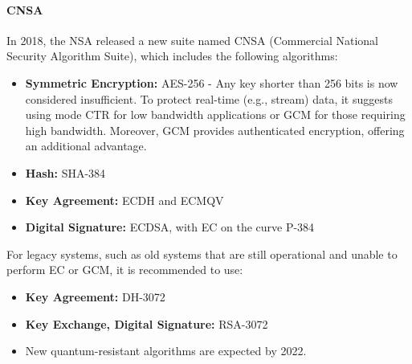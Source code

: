 \paragraph{CNSA}
In 2018, the NSA released a new suite named CNSA (Commercial National Security Algorithm Suite), which includes the following algorithms:
\begin{itemize}
	\item \textbf{Symmetric Encryption:} AES-256 - Any key shorter than 256 bits is now considered insufficient. To protect real-time (e.g., stream) data, it suggests using mode CTR for low bandwidth applications or GCM for those requiring high bandwidth. Moreover, GCM provides authenticated encryption, offering an additional advantage.
	\item \textbf{Hash:} SHA-384
	\item \textbf{Key Agreement:} ECDH and ECMQV
	\item \textbf{Digital Signature:} ECDSA, with EC on the curve P-384
\end{itemize}
For legacy systems, such as old systems that are still operational and unable to perform EC or GCM, it is recommended to use:
\begin{itemize}
	\item \textbf{Key Agreement:} DH-3072
	\item \textbf{Key Exchange, Digital Signature:} RSA-3072
	\item New quantum-resistant algorithms are expected by 2022.
\end{itemize}

